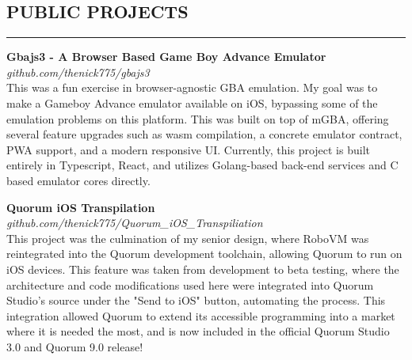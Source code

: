 \documentclass{res}
\begin{document}
\begin{resume}
\vspace{-3pt}

		\section{{PUBLIC PROJECTS}}
    \noindent\rule[0.5ex]{\linewidth}{1pt}
        {\bf Gbajs3 - A Browser Based Game Boy Advance Emulator} \\
			\emph{github.com/thenick775/gbajs3} \hfill \vspace{3pt} \\
			This was a fun exercise in browser-agnostic GBA emulation. My goal was to make a Gameboy Advance emulator available on iOS, bypassing some of the emulation problems on this platform. This was built on top of mGBA, offering several feature upgrades such as wasm compilation, a concrete emulator contract, PWA support, and a modern responsive UI. Currently, this project is built entirely in Typescript, React, and utilizes Golang-based back-end services and C based emulator cores directly.

\vspace{-4pt}

		{\bf Quorum iOS Transpilation} \\
			\emph{github.com/thenick775/Quorum\_iOS\_Transpiliation} \hfill \vspace{2.5pt}\\
			This project was the culmination of my senior design, where RoboVM was reintegrated into the Quorum development toolchain, allowing Quorum to run on iOS devices. This feature was taken from development to beta testing, where the architecture and code modifications used here were integrated into Quorum Studio's source under the "Send to iOS" button, automating the process. This integration allowed Quorum to extend its accessible programming into a market where it is needed the most, and is now included in the official Quorum Studio 3.0 and Quorum 9.0 release!

\end{resume}
\end{document}
